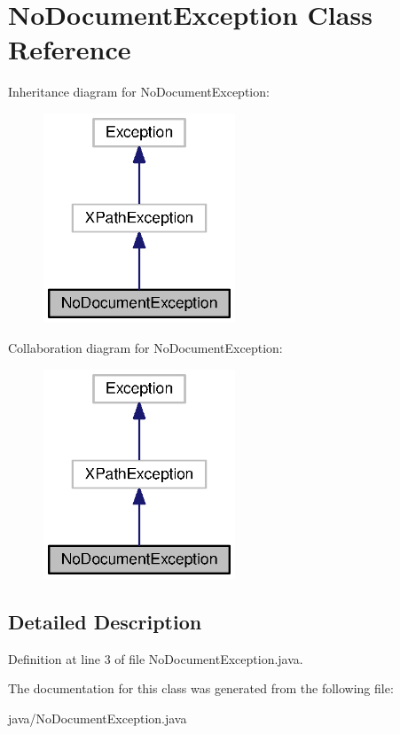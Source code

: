 \section{No\-Document\-Exception Class Reference}
\label{classorg_1_1smallfoot_1_1xpath_1_1NoDocumentException}


Inheritance diagram for No\-Document\-Exception\-:\nopagebreak
\begin{figure}[H]
\begin{center}
\leavevmode
\includegraphics[width=162pt]{classorg_1_1smallfoot_1_1xpath_1_1NoDocumentException__inherit__graph}
\end{center}
\end{figure}


Collaboration diagram for No\-Document\-Exception\-:\nopagebreak
\begin{figure}[H]
\begin{center}
\leavevmode
\includegraphics[width=162pt]{classorg_1_1smallfoot_1_1xpath_1_1NoDocumentException__coll__graph}
\end{center}
\end{figure}


\subsection{Detailed Description}


Definition at line 3 of file No\-Document\-Exception.\-java.



The documentation for this class was generated from the following file\-:\begin{DoxyCompactItemize}
\item 
java/No\-Document\-Exception.\-java\end{DoxyCompactItemize}
